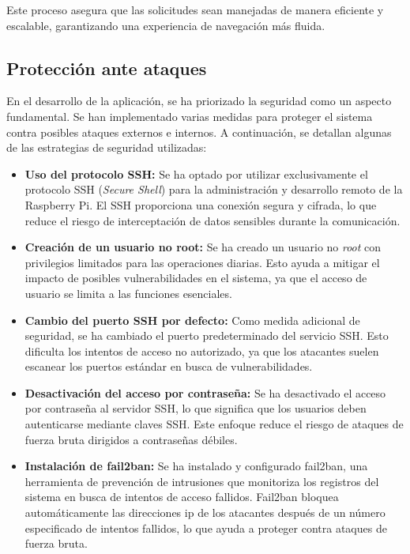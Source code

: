 Este proceso asegura que las solicitudes sean manejadas de manera eficiente y escalable, garantizando una experiencia de navegación más fluida.

\subsection{Protección ante ataques}

En el desarrollo de la aplicación, se ha priorizado la seguridad como un aspecto fundamental. Se han implementado varias medidas \cite{RpiSecure} para proteger el sistema contra posibles ataques externos e internos. A continuación, se detallan algunas de las estrategias de seguridad utilizadas:

\begin{itemize}
	\item \textbf{Uso del protocolo SSH:} Se ha optado por utilizar exclusivamente el protocolo SSH (\textit{Secure Shell}) para la administración y desarrollo remoto de la Raspberry Pi. El SSH proporciona una conexión segura y cifrada, lo que reduce el riesgo de interceptación de datos sensibles durante la comunicación.

	\item \textbf{Creación de un usuario no root:} Se ha creado un usuario no \textit{root} con privilegios limitados para las operaciones diarias. Esto ayuda a mitigar el impacto de posibles vulnerabilidades en el sistema, ya que el acceso de usuario se limita a las funciones esenciales.

	\item \textbf{Cambio del puerto SSH por defecto:} Como medida adicional de seguridad, se ha cambiado el puerto predeterminado del servicio SSH. Esto dificulta los intentos de acceso no autorizado, ya que los atacantes suelen escanear los puertos estándar en busca de vulnerabilidades.

	\item \textbf{Desactivación del acceso por contraseña:} Se ha desactivado el acceso por contraseña al servidor SSH, lo que significa que los usuarios deben autenticarse mediante claves SSH. Este enfoque reduce el riesgo de ataques de fuerza bruta dirigidos a contraseñas débiles.

	\item \textbf{Instalación de fail2ban:} Se ha instalado y configurado fail2ban, una herramienta de prevención de intrusiones que monitoriza los registros del sistema en busca de intentos de acceso fallidos. Fail2ban bloquea automáticamente las direcciones ip de los atacantes después de un número especificado de intentos fallidos, lo que ayuda a proteger contra ataques de fuerza bruta.


\end{itemize}
